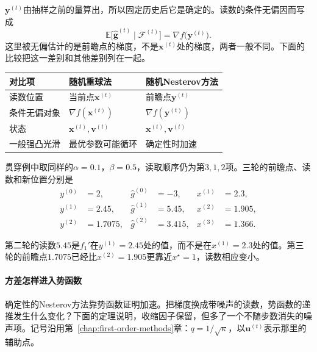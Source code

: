 $\bm{y}^{(t)}$由抽样之前的量算出，所以固定历史后它是确定的。读数的条件无偏因而写成
\begin{equation}
 \mathbb{E}\bigl[\hat{\bm g}^{(t)}\mid\mathcal{F}^{(t)}\bigr]=\nabla f\bigl(\bm{y}^{(t)}\bigr).
 \label{eq:sgdb-nag-unbiased}
\end{equation}
这里被无偏估计的是前瞻点的梯度，不是$\bm{x}^{(t)}$处的梯度，两者一般不同。下面的比较把这一差别和其他差别列在一起。

\begin{BookInlineTable}
  \centering
  \caption{随机重球法与随机Nesterov方法的比较。}
  \label{tab:sgdb-momentum-compare}
  \begin{tabular}{lll}
    \toprule
    对比项 & 随机重球法 & 随机Nesterov方法\\
    \midrule
    读数位置 & 当前点$\bm{x}^{(t)}$ & 前瞻点$\bm{y}^{(t)}$\\
    条件无偏对象 & $\nabla f(\bm{x}^{(t)})$ & $\nabla f(\bm{y}^{(t)})$\\
    状态 & $\bm{x}^{(t)},\bm{v}^{(t)}$ & $\bm{x}^{(t)},\bm{v}^{(t)}$\\
    一般强凸光滑 & 最优参数可能循环 & 确定性时加速\\
    \bottomrule
  \end{tabular}
\end{BookInlineTable}

贯穿例中取同样的$\alpha=0.1$，$\beta=0.5$，读取顺序仍为第$3,1,2$项。三轮的前瞻点、读数和新位置分别是
\[
 \begin{aligned}
 y^{(0)}&=2, & \hat g^{(0)}&=-3, & x^{(1)}&=2.3,\\
 y^{(1)}&=2.45, & \hat g^{(1)}&=5.45, & x^{(2)}&=1.905,\\
 y^{(2)}&=1.7075, & \hat g^{(2)}&=3.415, & x^{(3)}&=1.366.
 \end{aligned}
\]

第二轮的读数$5.45$是$f_1'$在$y^{(1)}=2.45$处的值，而不是在$x^{(1)}=2.3$处的值。第三轮的前瞻点$1.7075$已经比$x^{(2)}=1.905$更靠近$x^\star=1$，读数相应变小。

\paragraph{方差怎样进入势函数}
确定性的Nesterov方法靠势函数证明加速。把梯度换成带噪声的读数，势函数的递推发生什么变化？下面的定理说明，收缩因子保留，但多了一个不随步数消失的噪声项。记号沿用第~\ref{chap:first-order-methods}章：$q=1/\sqrt\kappa$，以$\bm{u}^{(t)}$表示那里的辅助点。

